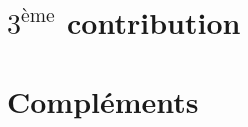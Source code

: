 \documentclass[10pt,aspectratio=169]{beamer}
\begin{document}
\section{$3^{\text{ème}}$ contribution}
  
  
  
  
  
  
  
\section{Compléments}


\end{document}

